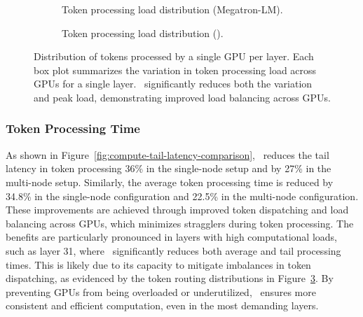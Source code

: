 \begin{figure}[h!]
    \centering
    \begin{subfigure}[b]{0.485\linewidth}
        \centering
        
        \caption{Token processing load distribution (Megatron-LM).}
        \label{fig:processing-load-baseline}
    \end{subfigure}
    \begin{subfigure}[b]{0.485\linewidth}
        \centering
        
        \caption{Token processing load distribution (\expertune).}
        \label{fig:processing-load-expertune}
    \end{subfigure}
    \caption{Distribution of tokens processed by a single GPU per layer. Each box plot summarizes the variation in token processing load across GPUs for a single layer. \expertune~significantly reduces both the variation and peak load, demonstrating improved load balancing across GPUs.}
    \label{fig:processing-load}
\end{figure}


\subsubsection{Token Processing Time}
%
As shown in Figure~\ref{fig:compute-tail-latency-comparison}, \expertune~reduces the tail latency in token processing 36\% in the single-node setup and by 27\% in the multi-node setup.
%
Similarly, the average token processing time is reduced by 34.8\% in the single-node configuration and 22.5\% in the multi-node configuration.
%
These improvements are achieved through improved token dispatching and load balancing across GPUs, which minimizes stragglers during token processing.
%
The benefits are particularly pronounced in layers with high computational loads, such as layer 31, where \expertune~significantly reduces both average and tail processing times. 
%
This is likely due to its capacity to mitigate imbalances in token dispatching, as evidenced by the token routing distributions in Figure~\ref{fig:processing-load}. 
%
By preventing GPUs from being overloaded or underutilized, \expertune~ensures more consistent and efficient computation, even in the most demanding layers.

